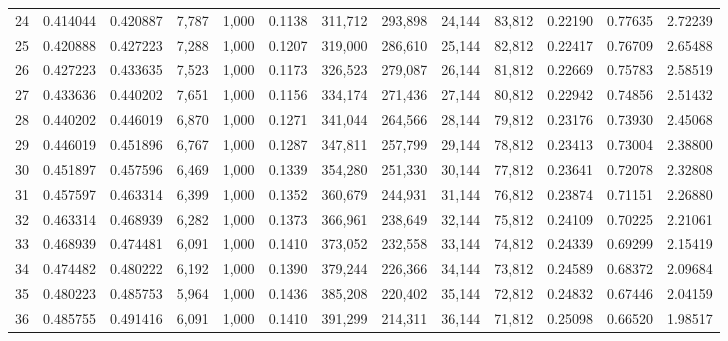 \begin{tabular}{rrrrrrrrrrrrr}
24  &  0.414044 &  0.420887 &   7,787 &  1,000 &                                     0.1138 &  311,712 &  293,898 &   24,144 &   83,812 &  0.22190 &  0.77635 &  2.72239 \\
25  &  0.420888 &  0.427223 &   7,288 &  1,000 &                                     0.1207 &  319,000 &  286,610 &   25,144 &   82,812 &  0.22417 &  0.76709 &  2.65488 \\
26  &  0.427223 &  0.433635 &   7,523 &  1,000 &                                     0.1173 &  326,523 &  279,087 &   26,144 &   81,812 &  0.22669 &  0.75783 &  2.58519 \\
27  &  0.433636 &  0.440202 &   7,651 &  1,000 &                                     0.1156 &  334,174 &  271,436 &   27,144 &   80,812 &  0.22942 &  0.74856 &  2.51432 \\
28  &  0.440202 &  0.446019 &   6,870 &  1,000 &                                     0.1271 &  341,044 &  264,566 &   28,144 &   79,812 &  0.23176 &  0.73930 &  2.45068 \\
29  &  0.446019 &  0.451896 &   6,767 &  1,000 &                                     0.1287 &  347,811 &  257,799 &   29,144 &   78,812 &  0.23413 &  0.73004 &  2.38800 \\
30  &  0.451897 &  0.457596 &   6,469 &  1,000 &                                     0.1339 &  354,280 &  251,330 &   30,144 &   77,812 &  0.23641 &  0.72078 &  2.32808 \\
31  &  0.457597 &  0.463314 &   6,399 &  1,000 &                                     0.1352 &  360,679 &  244,931 &   31,144 &   76,812 &  0.23874 &  0.71151 &  2.26880 \\
32  &  0.463314 &  0.468939 &   6,282 &  1,000 &                                     0.1373 &  366,961 &  238,649 &   32,144 &   75,812 &  0.24109 &  0.70225 &  2.21061 \\
33  &  0.468939 &  0.474481 &   6,091 &  1,000 &                                     0.1410 &  373,052 &  232,558 &   33,144 &   74,812 &  0.24339 &  0.69299 &  2.15419 \\
34  &  0.474482 &  0.480222 &   6,192 &  1,000 &                                     0.1390 &  379,244 &  226,366 &   34,144 &   73,812 &  0.24589 &  0.68372 &  2.09684 \\
35  &  0.480223 &  0.485753 &   5,964 &  1,000 &                                     0.1436 &  385,208 &  220,402 &   35,144 &   72,812 &  0.24832 &  0.67446 &  2.04159 \\
36  &  0.485755 &  0.491416 &   6,091 &  1,000 &                                     0.1410 &  391,299 &  214,311 &   36,144 &   71,812 &  0.25098 &  0.66520 &  1.98517 \\

\end{tabular}
